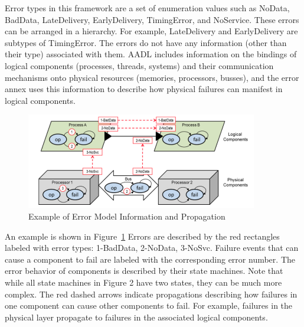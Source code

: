 Error types in this framework are a set of enumeration values such as NoData, BadData, LateDelivery, EarlyDelivery, TimingError, and NoService. These errors can be arranged in a hierarchy. For example, LateDelivery and EarlyDelivery are subtypes of TimingError. The errors do not have any information (other than their type) associated with them. AADL includes information on the bindings of logical components (processes, threads, systems) and their communication mechanisms onto physical resources (memories, processors, busses), and the error annex uses this information to describe how physical failures can manifest in logical components.

\begin{figure}
  \centering
 \includegraphics[width=0.9\textwidth]{images/error_annex.png}
  \vspace{-0.1in}
  \caption{Example of Error Model Information and Propagation}
  \label{fig:error_annex}
\end{figure}

An example is shown in Figure~\ref{fig:error_annex}
Errors are described by the red rectangles labeled with error types: 1-BadData, 2-NoData, 3-NoSvc. Failure events that can cause a component to fail are labeled with the corresponding error number. The error behavior of components is described by their state machines. Note that while all state machines in Figure 2 have two states, they can be much more complex. The red dashed arrows indicate propagations describing how failures in one component can cause other components to fail. For example, failures in the physical layer propagate to failures in the associated logical components.

